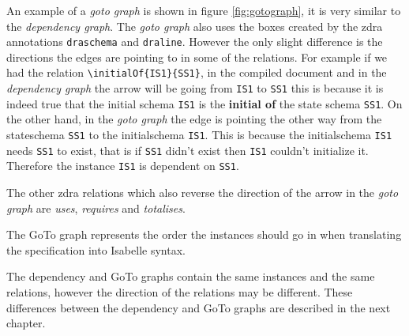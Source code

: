 An example of a \emph{goto graph} is shown in figure \ref{fig:gotograph}, it is
very similar to the \emph{dependency graph}. The \emph{goto graph} also uses the
boxes created by the \gls{zdra} annotations \verb|draschema| and \verb|draline|.
However the only slight difference is the directions the edges are pointing to
in some of the relations. For example if we had the relation
\verb|\initialOf{IS1}{SS1}|, in the compiled document and in the
\emph{dependency graph} the arrow will be going from \verb|IS1| to \verb|SS1|
this is because it is indeed true that the initial schema \verb|IS1| is the
\textbf{initial of} the state schema \verb|SS1|. On the other hand, in the
\emph{goto graph} the edge is pointing the other way from the stateschema
\verb|SS1| to the initialschema \verb|IS1|. This is because the initialschema
\verb|IS1| needs \verb|SS1| to exist, that is if \verb|SS1| didn't exist then
\verb|IS1| couldn't initialize it. Therefore the instance \verb|IS1| is dependent
on \verb|SS1|.

The other \gls{zdra} relations which also reverse the direction of the arrow in
the \emph{goto graph} are \emph{uses}, \emph{requires} and \emph{totalises}.

The GoTo graph represents the order the instances should go in when translating
the specification into Isabelle syntax.

The dependency and GoTo graphs contain the same instances and the same
relations, however  the direction of the relations may be different. These differences between the dependency and GoTo graphs are
described in the next chapter.




